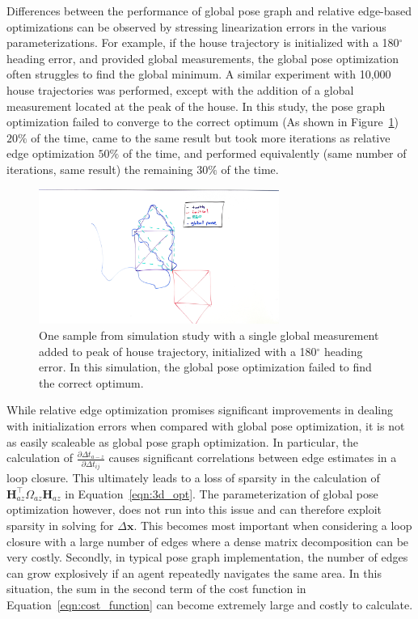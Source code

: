 Differences between the performance of global pose graph and relative edge-based optimizations can be observed by stressing linearization errors in the various parameterizations.  For example, if the house trajectory is initialized with a 180$^\circ$ heading error, and provided global measurements, the global pose optimization often struggles to find the global minimum.  A similar experiment with 10,000 house trajectories was performed, except with the addition of a global measurement located at the peak of the house.  In this study, the pose graph optimization failed to converge to the correct optimum (As shown in Figure~\ref{fig:g2o_heading_divergence}) $20\%$ of the time, came to the same result but took more iterations as relative edge optimization $50\%$ of the time, and performed equivalently (same number of iterations, same result) the remaining $30\%$ of the time.

\begin{figure}[H]
  \includegraphics[width=0.7\textwidth]{figures/house_g2o_diverged.jpg}
  \caption{One sample from simulation study with a single global measurement added to peak of house trajectory,  initialized with a 180$^\circ$ heading error.  In this simulation, the global pose optimization failed to find the correct optimum.}
  \label{fig:g2o_heading_divergence}
\end{figure}

While relative edge optimization promises significant improvements in dealing with initialization errors when compared with global pose optimization, it is not as easily scaleable as global pose graph optimization.  In particular, the calculation of $\frac {\partial\Delta t_{a-z}}{\partial\Delta t_{ij}}$ causes significant correlations between edge estimates in a loop closure.  This ultimately leads to a loss of sparsity in the calculation of $\mathbf{H}_{az}^\top \Omega_{az} \mathbf{H}_{az}$ in Equation~\ref{eqn:3d_opt}.  The parameterization of global pose optimization however, does not run into this issue and can therefore exploit sparsity in solving for $\Delta \mathbf{x}$.  This becomes most important when considering a loop closure with a large number of edges where a dense matrix decomposition can be very costly. Secondly, in typical pose graph implementation, the number of edges can grow explosively if an agent repeatedly navigates the same area.  In this situation, the sum in the second term of the cost function in Equation~\ref{eqn:cost_function} can become extremely large and costly to calculate.


